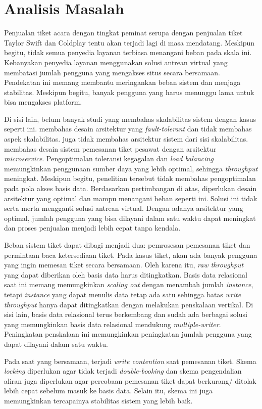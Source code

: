 
\section{Analisis Masalah}

Penjualan tiket acara dengan tingkat peminat serupa dengan penjualan tiket Taylor Swift dan Coldplay tentu akan terjadi lagi di masa mendatang. Meskipun begitu, tidak semua penyedia layanan terbiasa menangani beban pada skala ini. Kebanyakan penyedia layanan menggunakan solusi antrean virtual yang membatasi jumlah pengguna yang mengakses situs secara bersamaan. Pendekatan ini memang membantu meringankan beban sistem dan menjaga stabilitas. Meskipun begitu, banyak pengguna yang harus menunggu lama untuk bisa mengakses platform.

Di sisi lain, belum banyak studi yang membahas skalabilitas sistem dengan kasus seperti ini. \cite{microservicesEventDriven} membahas desain arsitektur yang \textit{fault-tolerant} dan tidak membahas aspek skalabilitas. \cite{backendForTicketing} juga tidak membahas arsitektur sistem dari sisi skalabilitas. \cite{barua2024enhancingresiliencescalabilitytravel} membahas desain sistem pemesanan tiket pesawat dengan arsitektur \textit{microservice}. Pengoptimalan toleransi kegagalan dan \textit{load balancing} memungkinkan penggunaan sumber daya yang lebih optimal, sehingga \textit{throughput} meningkat. Meskipun begitu, penelitian tersebut tidak membahas pengoptimalan pada pola akses basis data. Berdasarkan pertimbangan di atas, diperlukan desain arsitektur yang optimal dan mampu menangani beban seperti ini. Solusi ini tidak serta merta mengganti solusi antrean virtual. Dengan adanya arsitektur yang optimal, jumlah pengguna yang bisa dilayani dalam satu waktu dapat meningkat dan proses penjualan menjadi lebih cepat tanpa kendala.

Beban sistem tiket dapat dibagi menjadi dua: pemrosesan pemesanan tiket dan permintaan baca ketersediaan tiket. Pada kasus tiket, akan ada banyak pengguna yang ingin memesan tiket secara bersamaan. Oleh karena itu, \textit{raw throughput} yang dapat diberikan oleh basis data harus ditingkatkan. Basis data relasional saat ini memang memungkinkan \textit{scaling out} dengan menambah jumlah \textit{instance}, tetapi \textit{instance} yang dapat menulis data tetap ada satu sehingga batas \textit{write throughput} hanya dapat ditingkatkan dengan melakukan penskalaan vertikal. Di sisi lain, basis data relasional terus berkembang dan sudah ada berbagai solusi yang memungkinkan basis data relasional mendukung \textit{multiple-writer}. Peningkatan penskalaan ini memungkinkan peningkatan jumlah pengguna yang dapat dilayani dalam satu waktu.

Pada saat yang bersamaan, terjadi \textit{write contention} saat pemesanan tiket. Skema \textit{locking} diperlukan agar tidak terjadi \textit{double-booking} dan skema pengendalian aliran juga diperlukan agar percobaan pemesanan tiket dapat berkurang/ ditolak lebih cepat sebelum masuk ke basis data. Selain itu, skema ini juga memungkinkan tercapainya stabilitas sistem yang lebih baik.
